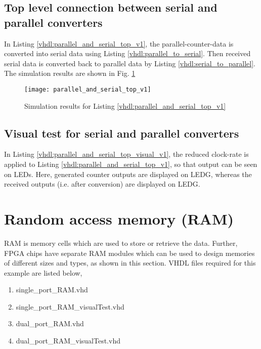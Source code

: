\subsection{Top level connection between serial and parallel converters}
In Listing \ref{vhdl:parallel_and_serial_top_v1}, the parallel-counter-data is converted into serial data using Listing \ref{vhdl:parallel_to_serial}. Then received serial data is converted back to parallel data by Listing \ref{vhdl:serial_to_parallel}. The simulation results are shown in Fig. \ref{fig:parallel_and_serial_top_v1}



\begin{figure}[!h]
	\centering
	\texttt{[image: parallel\_and\_serial\_top\_v1]}
	\caption{Simulation results for Listing \ref{vhdl:parallel_and_serial_top_v1}}
	\label{fig:parallel_and_serial_top_v1}
\end{figure}

\subsection{Visual test for serial and parallel converters}
In Listing \ref{vhdl:parallel_and_serial_top_visual_v1}, the reduced clock-rate is applied to Listing \ref{vhdl:parallel_and_serial_top_v1}, so that output can be seen on LEDs. Here, generated counter outputs are displayed on LEDG, whereas the received outputs (i.e. after conversion) are displayed on LEDG. 



\section{Random access memory (RAM)}\label{sec:RAM}
RAM is memory cells which are used to store or retrieve the data. Further, FPGA chips have separate RAM modules which can be used to design memories of different sizes and types, as shown in this section. VHDL files required for this example are listed below, 
\begin{enumerate}
	\item single\_port\_RAM.vhd
	\item single\_port\_RAM\_visualTest.vhd
	\item dual\_port\_RAM.vhd
	\item dual\_port\_RAM\_visualTest.vhd
\end{enumerate}

